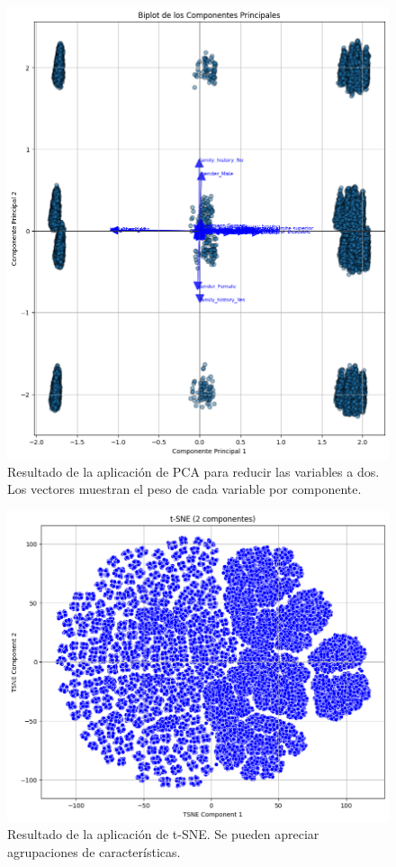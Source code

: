 \documentclass[10pt,journal,compsoc]{IEEEtran}
\begin{document}
\begin{figure}[htb]
    \centering
    \includegraphics[width=\linewidth]{imagenes/pca_biplot.png}
    \caption{Resultado de la aplicación de PCA para reducir las variables a dos. Los vectores muestran el peso de cada variable por componente.}
    \label{fig:pca}
\end{figure}

\begin{figure}[htb]
    \centering
    \includegraphics[width=\linewidth]{imagenes/tsne.png}
    \caption{Resultado de la aplicación de t-SNE. Se pueden apreciar agrupaciones de características.}
    \label{fig:tsne}
\end{figure}
\end{document}
